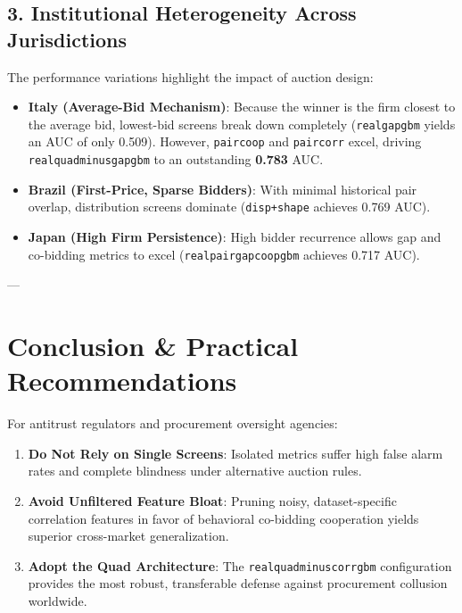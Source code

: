 \documentclass[11pt,a4paper]{article}
\renewcommand{\_}{\textunderscore\allowbreak}
\begin{document}
\subsection{3. Institutional Heterogeneity Across Jurisdictions}
The performance variations highlight the impact of auction design:
\begin{itemize}[noitemsep]
    \item \textbf{Italy (Average-Bid Mechanism)}: Because the winner is the firm closest to the average bid, lowest-bid screens break down completely (\texttt{real\_gap\_gbm} yields an AUC of only 0.509). However, \texttt{pair\_coop} and \texttt{pair\_corr} excel, driving \texttt{real\_quad\_minus\_gap\_gbm} to an outstanding \textbf{0.783} AUC.
    \item \textbf{Brazil (First-Price, Sparse Bidders)}: With minimal historical pair overlap, distribution screens dominate (\texttt{disp+shape} achieves 0.769 AUC).
    \item \textbf{Japan (High Firm Persistence)}: High bidder recurrence allows gap and co-bidding metrics to excel (\texttt{real\_pair\_gap\_coop\_gbm} achieves 0.717 AUC).
\end{itemize}

---

\section{Conclusion \& Practical Recommendations}

For antitrust regulators and procurement oversight agencies:
\begin{enumerate}[noitemsep]
    \item \textbf{Do Not Rely on Single Screens}: Isolated metrics suffer high false alarm rates and complete blindness under alternative auction rules.
    \item \textbf{Avoid Unfiltered Feature Bloat}: Pruning noisy, dataset-specific correlation features in favor of behavioral co-bidding cooperation yields superior cross-market generalization.
    \item \textbf{Adopt the Quad Architecture}: The \texttt{real\_quad\_minus\_corr\_gbm} configuration provides the most robust, transferable defense against procurement collusion worldwide.
\end{enumerate}
\end{document}
